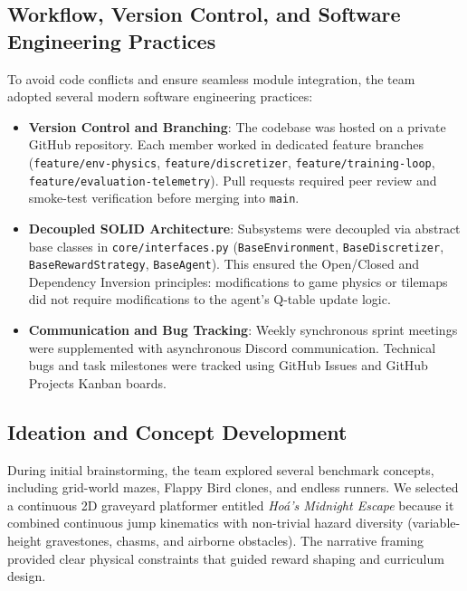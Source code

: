 \subsection{Workflow, Version Control, and Software Engineering Practices}
To avoid code conflicts and ensure seamless module integration, the team adopted several modern software engineering practices:
\begin{itemize}
    \item \textbf{Version Control and Branching}: The codebase was hosted on a private GitHub repository. Each member worked in dedicated feature branches (\texttt{feature/env-physics}, \texttt{feature/discretizer}, \texttt{feature/training-loop}, \texttt{feature/evaluation-telemetry}). Pull requests required peer review and smoke-test verification before merging into \texttt{main}.
    \item \textbf{Decoupled SOLID Architecture}: Subsystems were decoupled via abstract base classes in \texttt{core/interfaces.py} (\texttt{BaseEnvironment}, \texttt{BaseDiscretizer}, \texttt{BaseRewardStrategy}, \texttt{BaseAgent}). This ensured the Open/Closed and Dependency Inversion principles: modifications to game physics or tilemaps did not require modifications to the agent's Q-table update logic.
    \item \textbf{Communication and Bug Tracking}: Weekly synchronous sprint meetings were supplemented with asynchronous Discord communication. Technical bugs and task milestones were tracked using GitHub Issues and GitHub Projects Kanban boards.
\end{itemize}

\subsection{Ideation and Concept Development}
During initial brainstorming, the team explored several benchmark concepts, including grid-world mazes, Flappy Bird clones, and endless runners. We selected a continuous 2D graveyard platformer entitled \textit{Ho{\'a}'s Midnight Escape} because it combined continuous jump kinematics with non-trivial hazard diversity (variable-height gravestones, chasms, and airborne obstacles). The narrative framing provided clear physical constraints that guided reward shaping and curriculum design.
